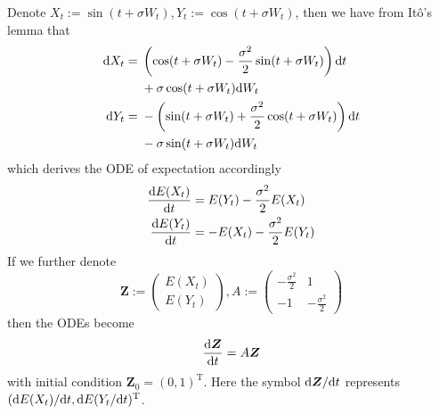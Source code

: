 \documentclass{homework}
\begin{document}
    \problem
    \newcommand{\X}{\boldsymbol Z}
    Denote $X_t:=\sin(t+\sigma W_t),Y_t:=\cos(t+\sigma W_t)$,
    then we have from It\^o's lemma that
    \[\begin{aligned}
        \mathrm d X_t&=
        \begin{aligned}[t]
        &\left(\cos(t+\sigma W_t)-\frac{\sigma^2}{2}\sin(t+\sigma W_t)\right)\mathrm d t\\
        &+\sigma\cos(t+\sigma W_t)\mathrm d W_t\\
        \end{aligned}\\
        \mathrm d Y_t&=
        \begin{aligned}[t]
        &-\left(\sin(t+\sigma W_t)+\frac{\sigma^2}{2}\cos(t+\sigma W_t)\right)\mathrm d t\\
        &-\sigma\sin(t+\sigma W_t)\mathrm d W_t
        \end{aligned}
    \end{aligned}\]
    which derives the ODE of expectation accordingly
    \[\begin{aligned}
        \frac{\mathrm d E(X_t)}{\mathrm d t}&=E(Y_t)-\frac{\sigma^2}{2}E(X_t)\\
        \frac{\mathrm d E(Y_t)}{\mathrm d t}&=-E(X_t)-\frac{\sigma^2}{2}E(Y_t)
    \end{aligned}\]
    If we further denote
    \[\X:=\begin{pmatrix}
        E(X_t)\\
        E(Y_t)
    \end{pmatrix},
    A:=\begin{pmatrix}
        -\frac{\sigma^2}{2} & 1\\
        -1 & -\frac{\sigma^2}{2}
    \end{pmatrix}\]
    then the ODEs become
    \[\frac{\diff\X}{\diff t}=A\X\]
    with initial condition $\X_0=(0,1)^\mathrm T$.
    Here the symbol $\diff\X/\diff t$ represents
    $(\mathrm d E(X_t)/\mathrm d t,\mathrm d E(Y_t/\mathrm d t)^\mathrm T$.
\end{document}
